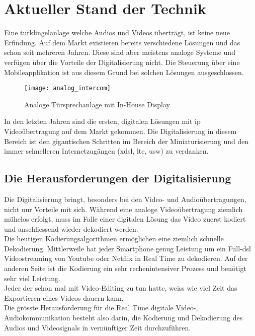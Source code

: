 \section{Aktueller Stand der Technik}
\label{sec:chapterexample}
Eine \gls{turklingelanlage} welche Audios und Videos überträgt, ist keine neue Erfindung. Auf dem Markt existieren bereits verschiedene Lösungen und das schon seit mehreren Jahren. Diese sind aber meistens analoge Systeme und verfügen über die Vorteile der Digitalisierung nicht. Die Steuerung über eine Mobileapplikation ist aus diesem Grund bei solchen Lösungen ausgeschlossen.

\begin{figure}[htb!]
	\begin{center}
		\texttt{[image: analog\_intercom]}
		\caption[Analoge Türsprechanlage mit In-House Display]{Analoge Türsprechanlage mit In-House Display}
		\label{fig:analoge_intercom}
	\end{center}
\end{figure}
In den letzten Jahren sind die ersten, digitalen Lösungen mit \gls{ip} Videoübertragung auf dem Markt gekommen. Die Digitalisierung in diesem Bereich ist den gigantischen Schritten im Bereich der Miniaturisierung und den immer schnelleren Internetzugängen (x\gls{dsl}, \gls{lte}, usw) zu verdanken.

\subsection{Die Herausforderungen der Digitalisierung}
Die Digitalisierung bringt, besonders bei den Video- und Audioübertragungen, nicht nur Vorteile mit sich.  Während eine analoge Videoübertragung ziemlich mühelos erfolgt, muss im Falle einer digitalen Lösung das Video zuerst kodiert und anschliessend wieder dekodiert werden.
\\
Die heutigen Kodierungsalgorithmen ermöglichen eine ziemlich schnelle Dekodierung. Mittlerweile hat jeder Smartphone genug Leistung um ein Full-\gls{dsl} Videostreaming von Youtube oder Netflix in Real Time zu dekodieren. Auf der anderen Seite ist die Kodierung ein sehr rechenintensiver Prozess und benötigt sehr viel Leistung.
\\
Jeder der schon mal mit Video-Editing zu tun hatte, weiss wie viel Zeit das Exportieren eines Videos dauern kann.
\\
Die grösste Herausforderung für die Real Time digitale Video-, Audiokommunikation besteht also darin, die Kodierung und Dekodierung des Audios und Videosignals in vernünftiger Zeit durchzuführen.

